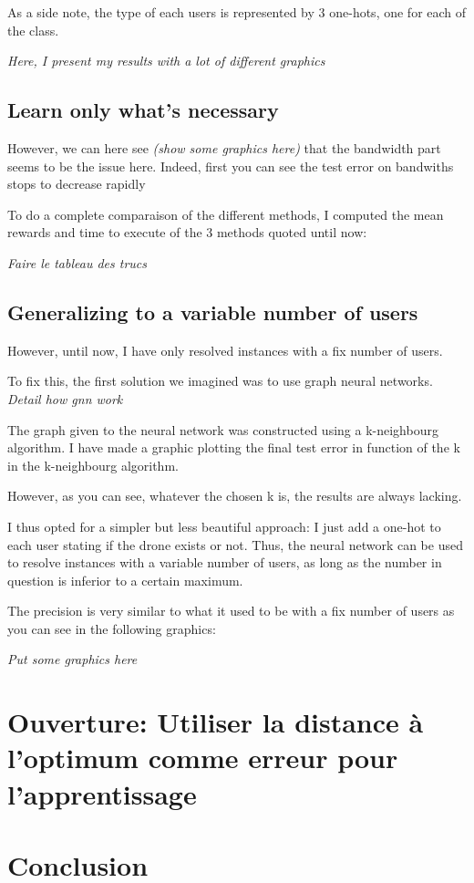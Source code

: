 \documentclass[letterpaper]{article}
\begin{document}
\begin{multicols}{2}
As a side note, the type of each users is represented by 3 one-hots, one for each of the class.

\textit{Here, I present my results with a lot of different graphics}

\subsection{Learn only what's necessary}

However, we can here see \textit{(show some graphics here)} that the bandwidth part seems to be the issue here.
Indeed, first you can see the test error on bandwiths stops to decrease rapidly

To do a complete comparaison of the different methods, I computed the mean rewards and time to execute of the 3 methods quoted until now:

\textit{Faire le tableau des trucs}

\subsection{Generalizing to a variable number of users}

However, until now, I have only resolved instances with a fix number of users.

To fix this, the first solution we imagined was to use graph neural networks.
\textit{Detail how gnn work}

The graph given to the neural network was constructed using a k-neighbourg algorithm.
I have made a graphic plotting the final test error in function of the k in the k-neighbourg algorithm.

However, as you can see, whatever the chosen k is, the results are always lacking.

I thus opted for a simpler but less beautiful approach: I just add a one-hot to each user stating if the drone exists or not.
Thus, the neural network can be used to resolve instances with a variable number of users, as long as the number in question is inferior to a certain maximum.

The precision is very similar to what it used to be with a fix number of users as you can see in the following graphics:

\textit{Put some graphics here}

\section{Ouverture: Utiliser la distance à l'optimum comme erreur pour l'apprentissage}

\section{Conclusion}

\end{multicols}
\end{document}
